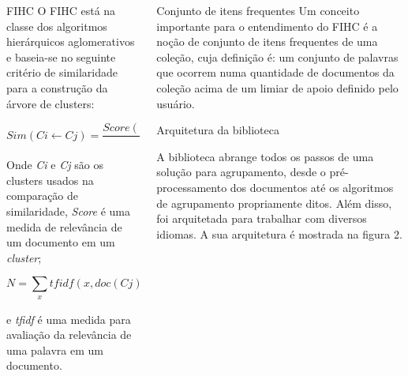 \documentclass[final]{beamer}
\newlength{\onecolwid}
\newlength{\twocolwid}
\begin{document}
\begin{frame}[t]
\begin{columns}[t]
\begin{column}{\twocolwid}
\begin{columns}[t,totalwidth=\twocolwid]
\begin{column}{\onecolwid}
\begin{block}{FIHC}
O FIHC está na classe dos algoritmos hierárquicos aglomerativos e baseia-se no seguinte critério de similaridade para a construção da árvore de clusters:

\begin{equation}
Sim(Ci \gets Cj) = \frac{Score(Ci \gets doc(Cj))}{N} + 1
\label{eqn:Sim}
\end{equation}

Onde \textit{Ci} e \textit{Cj} são os clusters usados na comparação de similaridade, \textit{Score} é uma medida de relevância de um documento em um \textit{cluster};

\begin{equation}
N = \sum_{x}tfidf(x, doc(Cj)) + \sum_{x'}tfidf(x', doc(Cj))
\label{eqn:Sim_N}
\end{equation}

e \textit{tfidf} é uma medida para avaliação da relevância de uma palavra em um documento.

\end{block}


\end{column} %

\begin{column}{\onecolwid}\vspace{-.6in} %


\begin{block}{Conjunto de itens frequentes}
Um conceito importante para o entendimento do FIHC é a noção de conjunto de itens frequentes de uma coleção, cuja definição é: um conjunto de palavras que ocorrem numa quantidade de documentos da coleção acima de um limiar de apoio definido pelo usuário.
\end{block}

\begin{block}{Arquitetura da biblioteca}

A biblioteca abrange todos os passos de uma solução para agrupamento, desde o pré-processamento dos documentos até os algoritmos de agrupamento propriamente ditos. Além disso, foi arquitetada para trabalhar com diversos idiomas. A sua arquitetura é mostrada na figura 2.


\end{block}
\end{column}
\end{columns}
\end{column}
\end{columns}
\end{frame}
\end{document}
